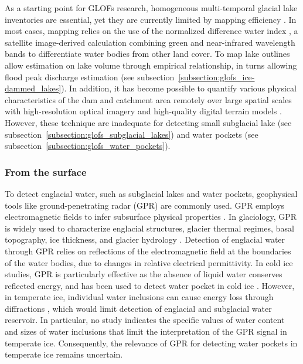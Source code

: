 As a starting point for GLOFs research, homogeneous multi-temporal glacial lake inventories are essential, yet they are currently limited by mapping efficiency \citep{Zhang&al2024}. In most cases, mapping relies on the use of the normalized difference water index \citep{McFeeters1996}, a satellite image-derived calculation combining green and near-infrared wavelength bands to differentiate water bodies from other land cover. To map lake outlines allow estimation on lake volume through empirical relationship, in turns allowing flood peak discharge estimation (see subsection~\ref{subsection:glofs_ice-dammed_lakes}). In addition, it has become possible to quantify various physical characteristics of the dam and catchment area remotely over large spatial scales with high-resolution optical imagery and high-quality digital terrain models \citep[e.g.][]{Dubey&al2020,Rounce&al2016}. However, these technique are inadequate for detecting small subglacial lake (see subsection~\ref{subsection:glofs_subglacial_lakes}) and water pockets (see subsection~\ref{subsection:glofs_water_pockets}).

\subsubsection{From the surface}

To detect englacial water, such as subglacial lakes and water pockets, geophysical tools like ground-penetrating radar (GPR) are commonly used. GPR employs electromagnetic fields to infer subsurface physical properties \citep{Davis&Annan1989}. In glaciology, GPR is widely used to characterize englacial structures, glacier thermal regimes, basal topography, ice thickness, and glacier hydrology \citep{Woodward&Burke2007,Plewes&Hubbard2001,Navarro&Eisen2009,Schroeder&al2020}. Detection of englacial water through GPR relies on reflections of the electromagnetic field at the boundaries of the water bodies, due to changes in relative electrical permittivity. In cold ice studies, GPR is particularly effective as the absence of liquid water conserves reflected energy, and has been used to detect water pocket in cold ice \citep{Vincent&al2012}. However, in temperate ice, individual water inclusions can cause energy loss through diffractions \citep{Smith&Evans1972,Murray&al2000}, which would limit detection of englacial and subglacial water reservoir. In particular, no study indicates the specific values of water content and sizes of water inclusions that limit the interpretation of the GPR signal in temperate ice. Consequently, the relevance of GPR for detecting water pockets in temperate ice remains uncertain.


